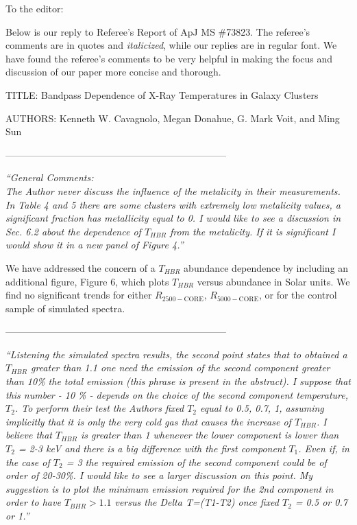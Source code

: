 \documentclass[11pt]{article}
\begin{document}
To the editor:

Below is our reply to Referee's Report of ApJ MS \#73823. The referee's
comments are in quotes and \textit{italicized}, while our replies are
in regular font. We have found the referee's comments to be very
helpful in making the focus and discussion of our paper more concise
and thorough.

TITLE: Bandpass Dependence of X-Ray Temperatures in Galaxy Clusters

AUTHORS: Kenneth W. Cavagnolo, Megan Donahue, G. Mark Voit, and Ming
Sun

---------------------------------------------------------------------

\textit{
``General Comments:\\
The Author never discuss the influence of the metalicity in
their measurements. In Table 4 and 5 there are some clusters
with extremely low metalicity values, a significant fraction
has metallicity equal to 0. I would like to see a discussion in
Sec. 6.2 about the dependence of $T_{HBR}$ from the metalicity. If
it is significant I would show it in a new panel of Figure 4.''
}

We have addressed the concern of a $T_{HBR}$ abundance dependence by
including an additional figure, Figure 6, which plots $T_{HBR}$ versus
abundance in Solar units. We find no significant trends for either
$R_{2500-\mathrm{CORE}}$, $R_{5000-\mathrm{CORE}}$, or for the control
sample of simulated spectra.

---------------------------------------------------------------------

\textit{
``Listening the simulated spectra results, the second point states that
to obtained a $T_{HBR}$ greater than 1.1 one need the emission of the
second component greater than 10\% the total emission (this phrase is
present in the abstract). I suppose that this number - 10 \% - depends
on the choice of the second component temperature, $T_2$. To perform
their test the Authors fixed $T_2$ equal to 0.5, 0.7, 1, assuming
implicitly that it is only the very cold gas that causes the increase
of $T_{HBR}$. I believe that $T_{HBR}$ is greater than 1 whenever the
lower component is lower than $T_2$ = 2-3 keV and there is a big
difference with the first component $T_1$. Even if, in the case of $T_2$ =
3 the required emission of the second component could be of order of
20-30\%. I would like to see a larger discussion on this point. My
suggestion is to plot the minimum emission required for the 2nd
component in order to have $T_{BHR}>1.1$ versus the Delta T=(T1-T2)
once fixed $T_2$ = 0.5 or 0.7 or 1.''
}
\end{document}
